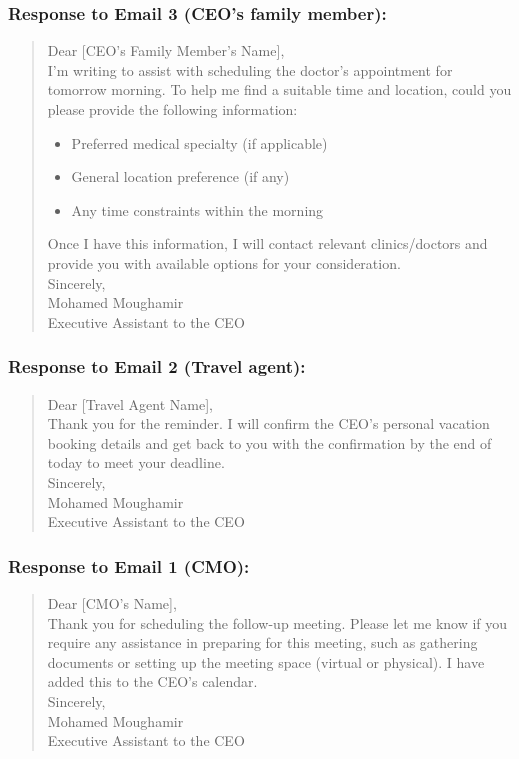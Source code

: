 \documentclass{article}
\newcommand{\emailText}[2]{
\begin{tcolorbox}[colback=yellow!10!white, colframe=black, title=#1]
\begin{quote}
#2
\end{quote}
\end{tcolorbox}
}
\begin{document}
\subsubsection{\textbf{Response to Email 3 (CEO’s family member):}}
\emailText{
Re: Doctor's Appointment Scheduling
}
{
Dear [CEO's Family Member's Name],\\

I'm writing to assist with scheduling the doctor's appointment for tomorrow morning. To help me find a suitable time and location, could you please provide the following information:\\

\begin{itemize}
    \item Preferred medical specialty (if applicable)
    \item General location preference (if any)
    \item Any time constraints within the morning
\end{itemize}

Once I have this information, I will contact relevant clinics/doctors and provide you with available options for your consideration.\\

Sincerely,\\

Mohamed Moughamir\\
Executive Assistant to the CEO
}

\subsubsection{\textbf{Response to Email 2 (Travel agent):}}
\emailText{Re: CEO's Personal Vacation Booking Confirmation}{
Dear [Travel Agent Name],\\

Thank you for the reminder. I will confirm the CEO's personal vacation booking details and get back to you with the confirmation by the end of today to meet your deadline.\\

Sincerely,\\

Mohamed Moughamir\\
Executive Assistant to the CEO
}

\subsubsection{\textbf{Response to Email 1 (CMO):}}
\emailText{
Re: Follow-up Meeting with Client - Thursday 3 PM EST
}{
Dear [CMO's Name],\\

Thank you for scheduling the follow-up meeting. Please let me know if you require any assistance in preparing for this meeting, such as gathering documents or setting up the meeting space (virtual or physical). I have added this to the CEO's calendar.\\

Sincerely,\\

Mohamed Moughamir\\
Executive Assistant to the CEO
}
\end{document}
